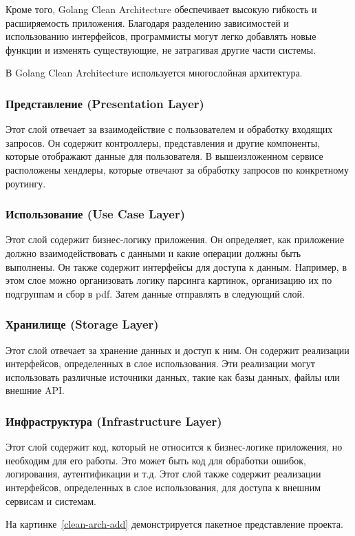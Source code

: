 Кроме того, Golang Clean Architecture обеспечивает высокую гибкость и расширяемость приложения. 
Благодаря разделению зависимостей и использованию интерфейсов, программисты могут легко добавлять новые функции и изменять существующие, не затрагивая другие части системы.

В Golang Clean Architecture используется многослойная архитектура.

\subsubsection{Представление (Presentation Layer)}
Этот слой отвечает за взаимодействие с пользователем и обработку входящих запросов.
Он содержит контроллеры, представления и другие компоненты, которые отображают данные для пользователя.
В вышеизложенном сервисе расположены хендлеры, которые отвечают за обработку запросов по конкретному роутингу.

\subsubsection{Использование (Use Case Layer)}
Этот слой содержит бизнес-логику приложения. 
Он определяет, как приложение должно взаимодействовать с данными и какие операции должны быть выполнены. 
Он также содержит интерфейсы для доступа к данным.
Например, в этом слое можно организовать логику парсинга картинок, организацию их по подгруппам и сбор в pdf.
Затем данные отправлять в следующий слой.

\subsubsection{Хранилище (Storage Layer)}
Этот слой отвечает за хранение данных и доступ к ним. 
Он содержит реализации интерфейсов, определенных в слое использования. 
Эти реализации могут использовать различные источники данных, такие как базы данных, файлы или внешние API.

\subsubsection{Инфраструктура (Infrastructure Layer)}
Этот слой содержит код, который не относится к бизнес-логике приложения, но необходим для его работы. 
Это может быть код для обработки ошибок, логирования, аутентификации и т.д. 
Этот слой также содержит реализации интерфейсов, определенных в слое использования, для доступа к внешним сервисам и системам.

На картинке~\ref{clean-arch-add} демонстрируется пакетное представление проекта.